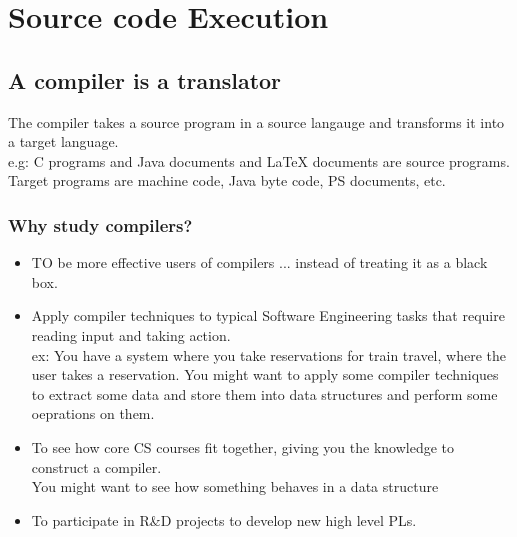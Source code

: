 \chapter{Source code Execution}


 \section{A compiler is a translator}
     The compiler takes a source program in a source langauge and transforms it into a target language. \\
     e.g: C programs and Java documents and \LaTeX{} documents are source programs. \\
     Target programs are machine code, Java byte code, PS documents, etc. \\
     
     \subsection{Why study compilers?}
        \begin{itemize}
            \item TO be more effective users of compilers ... instead of treating it as a black box. 
            \item Apply compiler techniques to typical Software Engineering tasks that require reading input and taking action.
            \\ ex: You have a system where you take reservations for train travel, where the user takes a reservation. You might want to apply some compiler techniques to extract some data and store them into data structures and perform some oeprations on them.
            \item To see how core CS courses fit together, giving you the knowledge to construct a compiler. \\ You might want to see how something behaves in a data structure
            \item To participate in R\&D projects to develop new high level PLs.
        \end{itemize}
    
